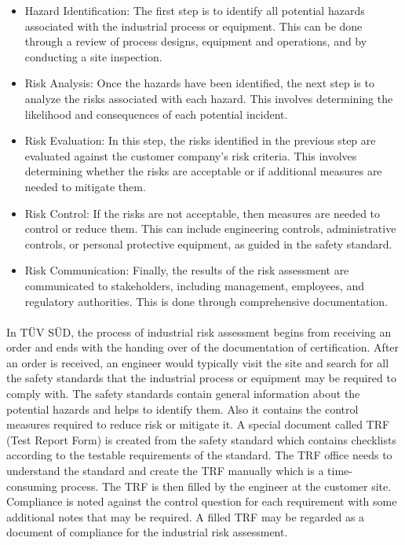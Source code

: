 \begin{itemize}
    \item Hazard Identification: The first step is to identify all potential hazards associated with the industrial process or equipment. This can be done through a review of process designs, equipment and operations, and by conducting a site inspection.
    \item Risk Analysis: Once the hazards have been identified, the next step is to analyze the risks associated with each hazard. This involves determining the likelihood and consequences of each potential incident.
    \item Risk Evaluation: In this step, the risks identified in the previous step are evaluated against the customer company's risk criteria. This involves determining whether the risks are acceptable or if additional measures are needed to mitigate them.
    \item Risk Control: If the risks are not acceptable, then measures are needed to control or reduce them. This can include engineering controls, administrative controls, or personal protective equipment, as guided in the safety standard.
    \item Risk Communication: Finally, the results of the risk assessment are communicated to stakeholders, including management, employees, and regulatory authorities. This is done through comprehensive documentation.
\end{itemize}

\paragraph{} In TÜV SÜD, the process of industrial risk assessment begins from receiving an order and ends with the handing over of the documentation of certification. After an order is received, an engineer would typically visit the site and search for all the safety standards that the industrial process or equipment may be required to comply with. The safety standards contain general information about the potential hazards and helps to identify them. Also it contains the control measures required to reduce risk or mitigate it. A special document called TRF (Test Report Form) is created from the safety standard which contains checklists according to the testable requirements of the standard. The TRF office needs to understand the standard and create the TRF manually which is a time-consuming process. The TRF is then filled by the engineer at the customer site. Compliance is noted against the control question for each requirement with some additional notes that may be required. A filled TRF may be regarded as a document of compliance for the industrial risk assessment.

